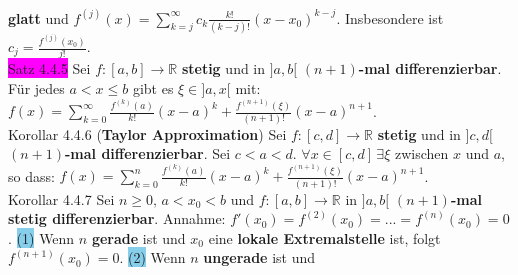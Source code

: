 \documentclass[landscape, 10pt]{article}
\newcommand{\R}{\mathbb{R}}
\begin{document}
\begin{multicols}{3}
                     \textbf{glatt} und \textcolor{NavyBlue}{$f^{(j)}(x)
                     =\sum_{k=j}^\infty c_k\frac{k!}{(k-j)!}(x-x_0)^{k-j}$}. 
                     Insbesondere ist 
                     \textcolor{NavyBlue}{$c_j=\frac{f^{(j)}(x_0)}{j!}$}.\\
              \colorbox{magenta}{Satz 4.4.5} 
                     Sei \textcolor{NavyBlue}{$f:[a,b]\longrightarrow\R$}
                     \textbf{stetig} und in 
                     \textcolor{NavyBlue}{$]a,b[$} 
                     \textbf{$(n+1)$-mal differenzierbar}. 
                     Für jedes \textcolor{NavyBlue}{$a<x\leqslant b$} gibt es 
                     \textcolor{NavyBlue}{$\xi\in]a,x[$} mit: 
                     \textcolor{NavyBlue}{
                     $f(x)=\sum_{k=0}^\infty\frac{f^{(k)}(a)}{k!}(x-a)^k
                     +\frac{f^{(n+1)}(\xi)}{(n+1)!}(x-a)^{n+1}$}. \\
              \colorbox{BurntOrange}{Korollar 4.4.6} 
              (\textbf{Taylor Approximation}) 
                     Sei \textcolor{NavyBlue}{$f:[c,d]\longrightarrow\R$} 
                     \textbf{stetig} und in 
                     \textcolor{NavyBlue}{$]c,d[$} 
                     \textbf{$(n+1)$-mal differenzierbar}. Sei 
                     \textcolor{NavyBlue}{$c<a<d$}. 
                     \textcolor{NavyBlue}{$\forall x\in[c,d]\,\exists\xi$} zwischen 
                     \textcolor{NavyBlue}{$x$} und \textcolor{NavyBlue}{$a$}, 
                     so dass: \textcolor{NavyBlue}{
                     $f(x)=\sum_{k=0}^n\frac{f^{(k)}(a)}{k!}(x-a)^k
                     +\frac{f^{(n+1)}(\xi)}{(n+1)!}(x-a)^{n+1}$}.\\
              \colorbox{BurntOrange}{Korollar 4.4.7} 
                     Sei \textcolor{NavyBlue}{$n\geqslant0,\,a<x_0<b$} und 
                     \textcolor{NavyBlue}{$f:[a,b]\longrightarrow\R$} 
                     in \textcolor{NavyBlue}{$]a,b[$} 
                     \textbf{$(n+1)$-mal stetig differenzierbar}.
                     Annahme: \textcolor{NavyBlue}{
                     $f'(x_0)=f^{(2)}(x_0)=...=f^{(n)}(x_0)=0$}. 
                     \colorbox{SkyBlue}{(1)} Wenn \textcolor{NavyBlue}{$n$} 
                     \textbf{gerade} 
                     ist und \textcolor{NavyBlue}{$x_0$} eine 
                     \textbf{lokale Extremalstelle} ist, folgt
                     \textcolor{NavyBlue}{ $f^{(n+1)}(x_0)=0$}. 
                     \colorbox{SkyBlue}{(2)} Wenn \textcolor{NavyBlue}{$n$} 
                     \textbf{ungerade}
                     ist und 

\end{multicols}
\end{document}
